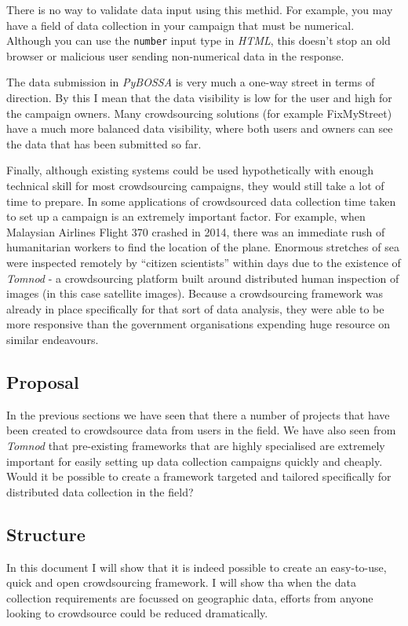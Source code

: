 \documentclass{article}
\begin{document}
		There is no way to validate data input using this methid.
		For example, you may have a field of data collection in your campaign that must be numerical.
		Although you can use the \texttt{number} input type in \textit{HTML}, this doesn't stop an old browser or malicious user sending non-numerical data in the response.

		The data submission in \textit{PyBOSSA} is very much a one-way street in terms of direction. By this I mean that the data visibility is low for the user and high for the campaign owners. Many crowdsourcing solutions (for example FixMyStreet) have a much more balanced data visibility, where both users and owners can see the data that has been submitted so far.

		Finally, although existing systems could be used hypothetically with enough technical skill for most crowdsourcing campaigns, they would still take a lot of time to prepare. In some applications of crowdsourced data collection time taken to set up a campaign is an extremely important factor. For example, when Malaysian Airlines Flight 370 crashed in 2014, there was an immediate rush of humanitarian workers to find the location of the plane. Enormous stretches of sea were inspected remotely by ``citizen scientists'' within days due to the existence of \textit{Tomnod} - a crowdsourcing platform built around distributed human inspection of images (in this case satellite images)\cite{tomnod-mh370}. Because a crowdsourcing framework was already in place specifically for that sort of data analysis, they were able to be more responsive than the government organisations expending huge resource on similar endeavours.

		\subsection{Proposal}
		In the previous sections we have seen that there a number of projects that have been created to crowdsource data from users in the field. We have also seen from \textit{Tomnod} that pre-existing frameworks that are highly specialised are extremely important for easily setting up data collection campaigns quickly and cheaply. Would it be possible to create a framework targeted and tailored specifically for distributed data collection in the field?

		\subsection{Structure}
		In this document I will show that it is indeed possible to create an easy-to-use, quick and open crowdsourcing framework. I will show tha when the data collection requirements are focussed on geographic data, efforts from anyone looking to crowdsource could be reduced dramatically.
\end{document}
